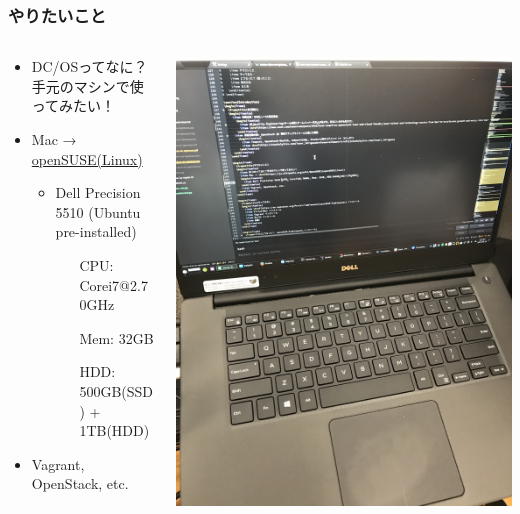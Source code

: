 \documentclass[aspectratio=169,11pt,hyperref={colorlinks=true}]{beamer}
\begin{document}
\begin{frame}
  \frametitle{やりたいこと}
  \begin{columns}[T]
    \begin{column}{.7\textwidth}
      \begin{itemize}
        \item DC/OSってなに？手元のマシンで使ってみたい！
        \item Mac → \href{https://ja.wikipedia.org/wiki/OpenSUSE}{openSUSE(Linux)}
          \begin{itemize}
            \item Dell Precision 5510 (Ubuntu pre-installed)
            \begin{itemize}
              \item[CPU:] Corei7@2.70GHz
              \item[Mem:] 32GB
              \item[HDD:] 500GB(SSD) + 1TB(HDD)
            \end{itemize}
          \end{itemize}
        \item Vagrant, OpenStack, etc.
      \end{itemize}
    \end{column}
    \begin{column}{.4\textwidth}
      \includegraphics[width=1.0\textwidth]{dell_precision_5510.jpg}
    \end{column}
  \end{columns}
\end{frame}
\end{document}

